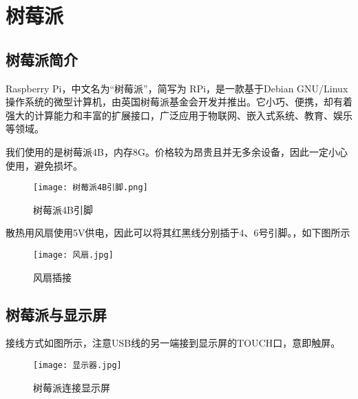 \chapter{树莓派}
\section{树莓派简介}
Raspberry Pi，中文名为“树莓派”，简写为 RPi，是一款基于Debian GNU/Linux操作系统的微型计算机，由英国树莓派基金会开发并推出。它小巧、便携，却有着强大的计算能力和丰富的扩展接口，广泛应用于物联网、嵌入式系统、教育、娱乐等领域。
\par
我们使用的是树莓派4B，内存8G。价格较为昂贵且并无多余设备，因此一定小心使用，避免损坏。
\begin{figure}[h]
	\centering
	\texttt{[image: 树莓派4B引脚.png]}
	\caption{树莓派4B引脚}
	\label{fig:example}
\end{figure}
\par
散热用风扇使用5V供电，因此可以将其红黑线分别插于4、6号引脚。，如下图所示
\begin{figure}[H]
	\centering
	\texttt{[image: 风扇.jpg]}
	\caption{风扇插接}
	\label{fig:example}
\end{figure}
\section{树莓派与显示屏}
接线方式如图所示，注意USB线的另一端接到显示屏的TOUCH口，意即触屏。
\begin{figure}[H]
	\centering
	\texttt{[image: 显示器.jpg]}
	\caption{树莓派连接显示屏}
	\label{fig:example}
\end{figure}

